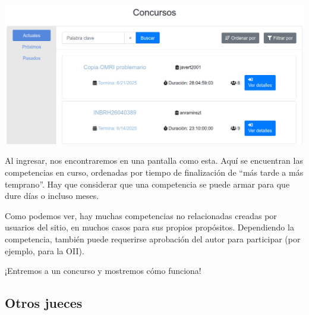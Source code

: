 \documentclass{beamer}
\begin{document}
    \begin{frame}[noframenumbering]
        \begin{center}
            \includegraphics[width=.8\linewidth]{./res/ou_contests.png}
        \end{center}\pause
        Al ingresar, nos encontraremos en una pantalla como esta. Aquí se encuentran las competencias en curso, ordenadas por tiempo de finalización de ``más tarde a más temprano''. Hay que considerar que una competencia se puede armar para que dure días o incluso meses. \pause

        Como podemos ver, hay muchas competencias no relacionadas creadas por usuarios del sitio, en muchos casos para sus propios propósitos. \pause Dependiendo la competencia, también puede requerirse aprobación del autor para participar (por ejemplo, para la OII).
    \end{frame}

    \begin{frame}[noframenumbering]
        \begin{center}
            \LARGE
            ¡Entremos a un concurso y mostremos cómo funciona!
        \end{center}
    \end{frame}
    
    \subsection{Otros jueces}
    \begin{frame}
    \end{frame}
\end{document}
